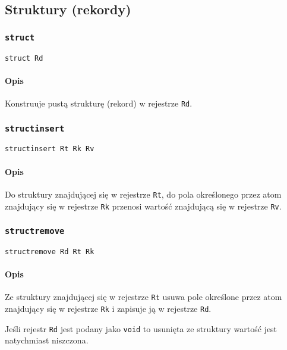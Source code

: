 \subsection{Struktury (rekordy)}
\label{viua_vm_ops_struct}

\subsubsection{\texttt{struct}}

\begin{lstlisting}
struct Rd
\end{lstlisting}

\paragraph*{Opis} Konstruuje pustą strukturę (rekord) w rejestrze \texttt{Rd}.

\subsubsection{\texttt{structinsert}}

\begin{lstlisting}
structinsert Rt Rk Rv
\end{lstlisting}

\paragraph*{Opis} Do struktury znajdującej się w rejestrze \texttt{Rt}, do pola
określonego przez atom znajdujący się w rejestrze \texttt{Rk} przenosi wartość
znajdującą się w rejestrze \texttt{Rv}.

\subsubsection{\texttt{structremove}}

\begin{lstlisting}
structremove Rd Rt Rk
\end{lstlisting}

\paragraph*{Opis} Ze struktury znajdującej się w rejestrze \texttt{Rt} usuwa
pole określone przez atom znajdujący się w rejestrze \texttt{Rk} i zapisuje ją w
rejestrze \texttt{Rd}.

Jeśli rejestr \texttt{Rd} jest podany jako \texttt{void} to usunięta ze
struktury wartość jest natychmiast niszczona.

